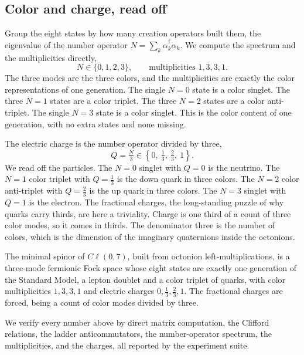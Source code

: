 \subsection{Color and charge, read off}

Group the eight states by how many creation operators built them, the eigenvalue of the number operator
$N = \sum_k \alpha_k^\dagger \alpha_k$. We compute the spectrum and the multiplicities directly,
\begin{equation}
  N \in \{0, 1, 2, 3\}, \qquad \text{multiplicities } 1, 3, 3, 1 .
\end{equation}
The three modes are the three colors, and the multiplicities are exactly the color representations of one generation.
The single $N=0$ state is a color singlet. The three $N=1$ states are a color triplet. The three $N=2$ states are a
color anti-triplet. The single $N=3$ state is a color singlet. This is the color content of one generation, with no
extra states and none missing.

The electric charge is the number operator divided by three,
\begin{equation}
  Q = \tfrac{N}{3} \in \left\{ 0, \ \tfrac13, \ \tfrac23, \ 1 \right\}.
\end{equation}
We read off the particles. The $N=0$ singlet with $Q=0$ is the neutrino. The $N=1$ color triplet with $Q=\tfrac13$ is
the down quark in three colors. The $N=2$ color anti-triplet with $Q=\tfrac23$ is the up quark in three colors. The
$N=3$ singlet with $Q=1$ is the electron. The fractional charges, the long-standing puzzle of why quarks carry thirds,
are here a triviality. Charge is one third of a count of three color modes, so it comes in thirds. The denominator
three is the number of colors, which is the dimension of the imaginary quaternions inside the octonions.

\begin{result}
The minimal spinor of $C\ell(0,7)$, built from octonion left-multiplications, is a three-mode fermionic Fock space
whose eight states are exactly one generation of the Standard Model, a lepton doublet and a color triplet of quarks,
with color multiplicities $1, 3, 3, 1$ and electric charges $0, \tfrac13, \tfrac23, 1$. The fractional charges are
forced, being a count of color modes divided by three.
\end{result}

We verify every number above by direct matrix computation, the Clifford relations, the ladder anticommutators, the
number-operator spectrum, the multiplicities, and the charges, all reported by the experiment suite.


